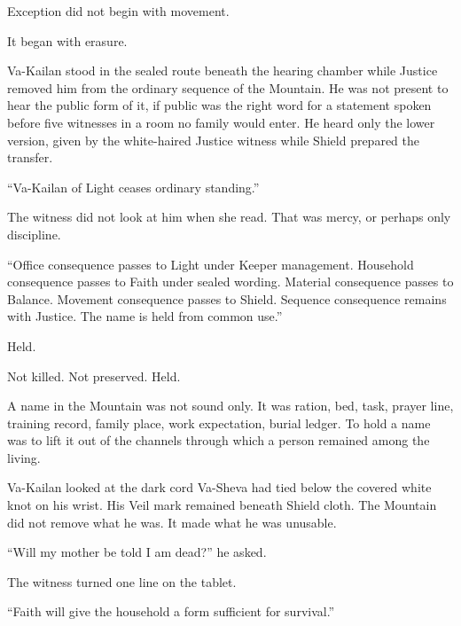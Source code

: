 

\noindent Exception did not begin with movement.\par

It began with erasure.\par

Va-Kailan stood in the sealed route beneath the hearing chamber while Justice removed him from the ordinary sequence of the Mountain. He was not present to hear the public form of it, if public was the right word for a statement spoken before five witnesses in a room no family would enter. He heard only the lower version, given by the white-haired Justice witness while Shield prepared the transfer.\par

“Va-Kailan of Light ceases ordinary standing.”\par

The witness did not look at him when she read. That was mercy, or perhaps only discipline.\par

“Office consequence passes to Light under Keeper management. Household consequence passes to Faith under sealed wording. Material consequence passes to Balance. Movement consequence passes to Shield. Sequence consequence remains with Justice. The name is held from common use.”\par

Held.\par

Not killed. Not preserved. Held.\par

A name in the Mountain was not sound only. It was ration, bed, task, prayer line, training record, family place, work expectation, burial ledger. To hold a name was to lift it out of the channels through which a person remained among the living.\par

Va-Kailan looked at the dark cord Va-Sheva had tied below the covered white knot on his wrist. His Veil mark remained beneath Shield cloth. The Mountain did not remove what he was. It made what he was unusable.\par

“Will my mother be told I am dead?” he asked.\par

The witness turned one line on the tablet.\par

“Faith will give the household a form sufficient for survival.”\par


